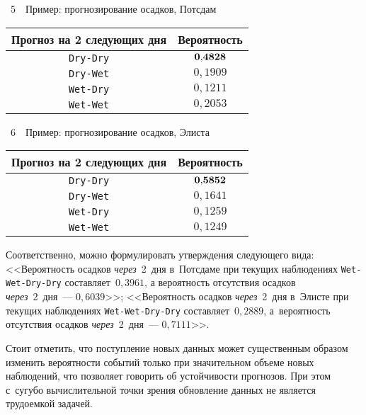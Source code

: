 \begin{multicols}{2}
\vspace*{8pt}

\begin{center}
\parbox{68mm}{{{\tablename~5}\ \ \small{Пример: прогнозирование осадков, Потсдам}}}

\vspace*{2ex}

{\small
\begin{tabular}{|c|c|}
\hline
{Прогноз на 2 следующих дня}&{Вероятность}\\
\hline
\verb"Dry-Dry"&$\bf 0{,}4828$\\
\verb"Dry-Wet"&$0{,}1909$\\
\verb"Wet-Dry"&$0{,}1211$\\
\verb"Wet-Wet"&$0{,}2053$\\
\hline
\end{tabular}
}
\vspace*{10pt}

\parbox{68mm}{{{\tablename~6}\ \ \small{Пример: прогнозирование осадков, Элис\-та}}}

\vspace*{2ex}

{\small
\begin{tabular}{|c|c|}
\hline
{Прогноз на 2 следующих дня}&{Вероятность}\\
\hline
\verb"Dry-Dry"&$\bf 0{,}5852$\\
\verb"Dry-Wet"&$0{,}1641$\\
\verb"Wet-Dry"&$0{,}1259$\\
\verb"Wet-Wet"&$0{,}1249$\\
\hline
\end{tabular}
}
\vspace*{2pt}
\end{center}

\noindent
 Соответственно,
можно формулировать утверждения следующего вида: <<Вероятность осадков
\textit{через}~2~дня в~Потсдаме при текущих наблюдениях
\verb"Wet-Wet-Dry-Dry" составляет~$0{,}3961$, а вероятность отсутствия осадков
\textit{через}~2~дня~--- $0{,}6039$>>; <<Вероятность осадков \textit{через}~2~дня 
в~Элисте при текущих наблюдениях \verb"Wet-Wet-Dry-Dry" составляет~$0{,}2889$, 
а~вероятность отсутствия осадков \textit{через}~2~дня~--- $0{,}7111$>>.



Стоит отметить, что поступление новых данных может существенным образом
изменить вероятности событий только при значительном объеме новых
наблюдений, что позволяет говорить об устойчивости прогнозов. При этом с~сугубо
вычислительной точки зрения обновление данных не является трудоемкой
задачей.


\end{multicols}
